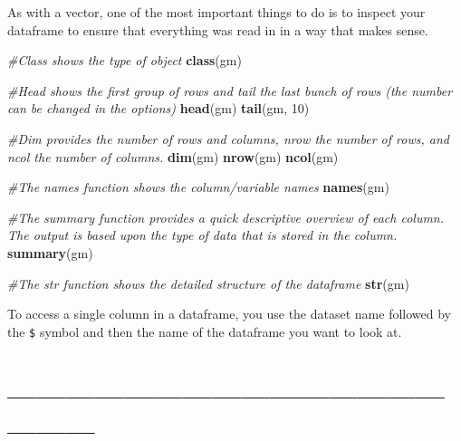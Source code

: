 \documentclass[]{article}
\newenvironment{Shaded}{\begin{snugshade}}{\end{snugshade}}
\newcommand{\KeywordTok}[1]{\textcolor[rgb]{0.13,0.29,0.53}{\textbf{{#1}}}}
\newcommand{\DataTypeTok}[1]{\textcolor[rgb]{0.13,0.29,0.53}{{#1}}}
\newcommand{\DecValTok}[1]{\textcolor[rgb]{0.00,0.00,0.81}{{#1}}}
\newcommand{\CommentTok}[1]{\textcolor[rgb]{0.56,0.35,0.01}{\textit{{#1}}}}
\newcommand{\OtherTok}[1]{\textcolor[rgb]{0.56,0.35,0.01}{{#1}}}
\newcommand{\NormalTok}[1]{{#1}}
\begin{document}
As with a vector, one of the most important things to do is to inspect
your dataframe to ensure that everything was read in in a way that makes
sense.

\begin{Shaded}
\begin{Highlighting}[]
\CommentTok{#Class shows the type of object}
\KeywordTok{class}\NormalTok{(gm)}

\CommentTok{#Head shows the first group of rows and tail the last bunch of rows (the number can be changed in the options)}
\KeywordTok{head}\NormalTok{(gm)}
\KeywordTok{tail}\NormalTok{(gm, }\DecValTok{10}\NormalTok{)}

\CommentTok{#Dim provides the number of rows and columns, nrow the number of rows, and ncol the number of columns.}
\KeywordTok{dim}\NormalTok{(gm)}
\KeywordTok{nrow}\NormalTok{(gm)}
\KeywordTok{ncol}\NormalTok{(gm)}

\CommentTok{#The names function shows the column/variable names}
\KeywordTok{names}\NormalTok{(gm)}

\CommentTok{#The summary function provides a quick descriptive overview of each column. The output is based upon the type of data that is stored in the column.}
\KeywordTok{summary}\NormalTok{(gm)}

\CommentTok{#The str function shows the detailed structure of the dataframe}
\KeywordTok{str}\NormalTok{(gm)}
\end{Highlighting}
\end{Shaded}

To access a single column in a dataframe, you use the dataset name
followed by the \texttt{\$} symbol and then the name of the dataframe
you want to look at.

\begin{Shaded}
\end{Shaded}

\section{------------------------------------------------------}\label{section-4}
\end{document}

